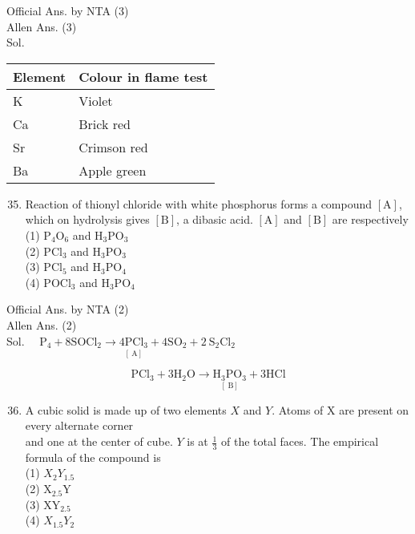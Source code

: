 \documentclass[10pt]{article}
\begin{document}
Official Ans. by NTA (3)\\
Allen Ans. (3)\\
Sol.

\begin{center}
\begin{tabular}{|l|l|}
\hline
Element & Colour in flame test \\
\hline
K & Violet \\
\hline
Ca & Brick red \\
\hline
Sr & Crimson red \\
\hline
Ba & Apple green \\
\hline
\end{tabular}
\end{center}

\begin{enumerate}
  \setcounter{enumi}{34}
  \item Reaction of thionyl chloride with white phosphorus forms a compound \([\mathrm{A}]\), which on hydrolysis gives \([\mathrm{B}]\), a dibasic acid. \([\mathrm{A}]\) and \([\mathrm{B}]\) are respectively\\
(1) \(\mathrm{P}_{4} \mathrm{O}_{6}\) and \(\mathrm{H}_{3} \mathrm{PO}_{3}\)\\
(2) \(\mathrm{PCl}_{3}\) and \(\mathrm{H}_{3} \mathrm{PO}_{3}\)\\
(3) \(\mathrm{PCl}_{5}\) and \(\mathrm{H}_{3} \mathrm{PO}_{4}\)\\
(4) \(\mathrm{POCl}_{3}\) and \(\mathrm{H}_{3} \mathrm{PO}_{4}\)
\end{enumerate}

Official Ans. by NTA (2)\\
Allen Ans. (2)\\
Sol. \(\quad \mathrm{P}_{4}+8 \mathrm{SOCl}_{2} \rightarrow \underset{[\mathrm{~A}]}{4 \mathrm{PCl}_{3}}+4 \mathrm{SO}_{2}+2 \mathrm{~S}_{2} \mathrm{Cl}_{2}\)

\[
\mathrm{PCl}_{3}+3 \mathrm{H}_{2} \mathrm{O} \rightarrow \underset{[\mathrm{~B}]}{\mathrm{H}_{3} \mathrm{PO}_{3}}+3 \mathrm{HCl}
\]

\begin{enumerate}
  \setcounter{enumi}{35}
  \item A cubic solid is made up of two elements \(X\) and \(Y\). Atoms of X are present on every alternate corner\\
and one at the center of cube. \(Y\) is at \(\frac{1}{3}\) of the total faces. The empirical formula of the compound is\\
(1) \(X_{2} Y_{1.5}\)\\
(2) \(\mathrm{X}_{2.5} \mathrm{Y}\)\\
(3) \(\mathrm{XY}_{2.5}\)\\
(4) \(X_{1.5} Y_{2}\)
\end{enumerate}
\end{document}
